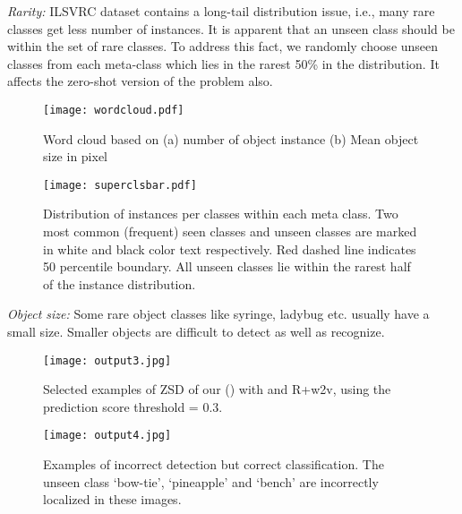 \documentclass[runningheads]{llncs}
\begin{document}
\textit{Rarity:} ILSVRC dataset contains a long-tail distribution issue, i.e., many rare classes get less number of instances. It is apparent that an unseen class should be within the set of rare classes. To address this fact, we randomly choose unseen classes from each meta-class  which lies in the rarest 50\% in the distribution. It affects the zero-shot version of the problem also.


\begin{figure}[t]
  \begin{center}
\texttt{[image: wordcloud.pdf]}
\end{center}
    \caption{Word cloud based on (a) number of object instance (b) Mean object size in pixel}
    \label{fig:wordcloud}
\end{figure}

\begin{figure*}[t]
  \begin{center}
\texttt{[image: superclsbar.pdf]}
\end{center}
   \caption{Distribution of instances per classes within each meta class. Two most common (frequent) seen classes and unseen classes are marked in white and black color text respectively. Red dashed line indicates 50 percentile boundary. All unseen classes lie within the rarest half of the instance distribution.}
\label{fig:superclsbar}
\end{figure*}

\textit{Object size:} Some rare object classes like syringe, ladybug etc. usually have a small size. Smaller objects are difficult to detect as well as recognize.

\begin{figure*}[t]
  \begin{center}
\texttt{[image: output3.jpg]}
\end{center}
    \caption{Selected examples of ZSD of our () with  and R+w2v, using the prediction score threshold = 0.3.}
    \label{fig:output}
\end{figure*}

\begin{figure*}[!t]
  \begin{center}
\texttt{[image: output4.jpg]}
\end{center}
    \caption{Examples of incorrect detection but correct classification. The unseen class `bow-tie', `pineapple' and `bench' are incorrectly localized in these images.}
    \label{fig:output_neg}
\end{figure*}
\end{document}

